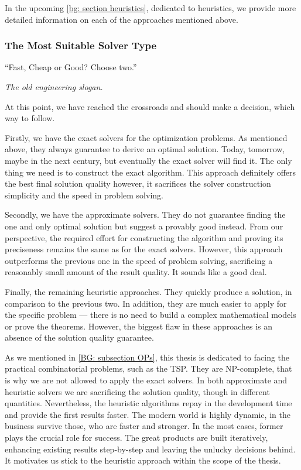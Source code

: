 In the upcoming \cref{bg: section heuristics}, dedicated to heuristics, we provide more detailed information on each of the approaches mentioned above.


\subsubsection{The Most Suitable Solver Type}
\epigraph{``Fast, Cheap or Good? Choose two.''}{\textit{The old engineering slogan.}}

At this point, we have reached the crossroads and should make a decision, which way to follow.

Firstly, we have the exact solvers for the optimization problems. As mentioned above, they always guarantee to derive an optimal solution. Today, tomorrow, maybe in the next century, but eventually the exact solver will find it. The only thing we need is to construct the exact algorithm. This approach definitely offers the best final solution quality however, it sacrifices the solver construction simplicity and the speed in problem solving.

Secondly, we have the approximate solvers. They do not guarantee finding the one and only optimal solution but suggest a provably good instead. From our perspective, the required effort for constructing the algorithm and proving its preciseness remains the same as for the exact solvers. However, this approach outperforms the previous one in the speed of problem solving, sacrificing a reasonably small amount of the result quality. It sounds like a good deal.

Finally, the remaining heuristic approaches. They quickly produce a solution, in comparison to the previous two. In addition, they are much easier to apply for the specific problem — there is no need to build a complex mathematical models or prove the theorems. However, the biggest flaw in these approaches is an absence of the solution quality guarantee.

As we mentioned in \cref{BG: subsection OPs}, this thesis is dedicated to facing the practical combinatorial problems, such as the TSP. They are NP-complete, that is why we are not allowed to apply the exact solvers. In both approximate and heuristic solvers we are sacrificing the solution quality, though in different quantities. Nevertheless, the heuristic algorithms repay in the development time and provide the first results faster. The modern world is highly dynamic, in the business survive those, who are faster and stronger. In the most cases, former plays the crucial role for success. The great products are built iteratively, enhancing existing results step-by-step and leaving the unlucky decisions behind. It motivates us stick to the heuristic approach within the scope of the thesis.

